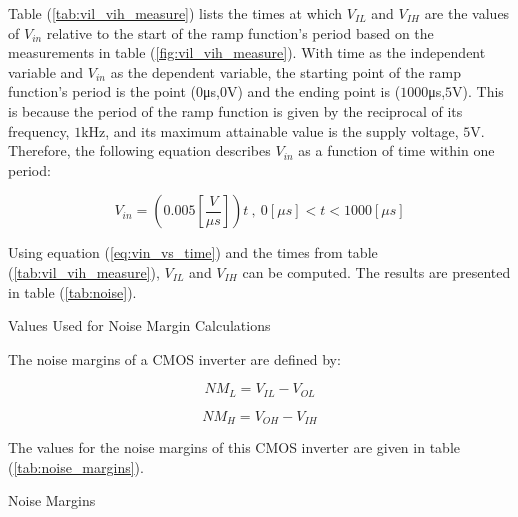 \FloatBarrier

Table (\ref{tab:vil_vih_measure}) lists the times at which $V_{IL}$ and $V_{IH}$ are the values of $V_{in}$ relative to the start of the ramp function's period based on the measurements in table (\ref{fig:vil_vih_measure}).
With time as the independent variable and $V_{in}$ as the dependent variable, the starting point of the ramp function's period is the point ($0$\si{\micro\second},$0$\si{\volt}) and the ending point is ($1000$\si{\micro\second},$5$\si{\volt}).
This is because the period of the ramp function is given by the reciprocal of its frequency, $1$\si{\kilo\hertz}, and its maximum attainable value is the supply voltage, $5$\si{\volt}.
Therefore, the following equation describes $V_{in}$ as a function of time within one period:

\begin{equation}
	\label{eq:vin_vs_time}
	V_{in} = (0.005[\frac{V}{\mu s}])t \ , \ 0[\mu s] < t < 1000[\mu s]
\end{equation}

Using equation (\ref{eq:vin_vs_time}) and the times from table (\ref{tab:vil_vih_measure}), $V_{IL}$ and $V_{IH}$ can be computed.
The results are presented in table (\ref{tab:noise}).

\FloatBarrier

\begin{table}[h!]
	\centering
	\caption{Values Used for Noise Margin Calculations}
	\label{tab:noise}
\end{table}

\FloatBarrier

The noise margins of a CMOS inverter are defined by:

\begin{equation}
	\label{eq:nml}
	NM_{L} = V_{IL} - V_{OL}
\end{equation}

\begin{equation}
	\label{eq:nmh}
	NM_{H} = V_{OH} - V_{IH}
\end{equation}

The values for the noise margins of this CMOS inverter are given in table (\ref{tab:noise_margins}).

\FloatBarrier

\begin{table}[h!]
	\centering
	\caption{Noise Margins}
	\label{tab:noise_margins}
\end{table}

\FloatBarrier
